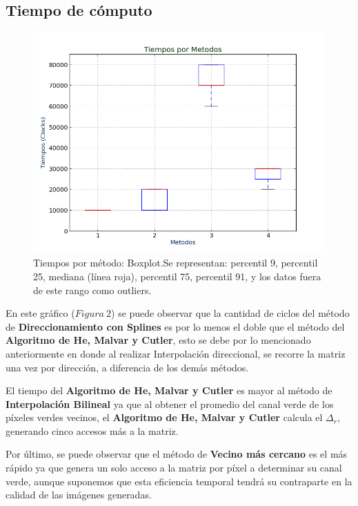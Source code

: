 \documentclass[a4paper]{article}
\begin{document}
\subsection{Tiempo de cómputo}

\begin{figure}[htbp]
\centering
\includegraphics[width=340pt]{img/Tiempos.png}
\caption{Tiempos por método: Boxplot.\newline Se representan: percentil 9, percentil 25, mediana (línea roja), percentil 75, percentil 91, y los datos fuera de este rango como outliers.}
\end{figure}

En este gráfico ($Figura\ 2$) se puede observar que la cantidad de ciclos del método de \textbf{Direccionamiento con Splines} es por lo menos el doble que el método del \textbf{Algoritmo de He, Malvar y Cutler}, esto se debe por lo mencionado anteriormente en donde al realizar Interpolación direccional, se recorre la matriz una vez por dirección, a diferencia de los demás métodos. 

El tiempo del \textbf{Algoritmo de He, Malvar y Cutler} es mayor al método de \textbf{Interpolación Bilineal} ya que al obtener el promedio del canal verde de los píxeles verdes vecinos, el \textbf{Algoritmo de He, Malvar y Cutler} calcula el $\Delta_r$, generando cinco accesos más a la matriz.

Por último, se puede observar que el método de \textbf{Vecino más cercano} es el más rápido ya que genera un solo acceso a la matriz por píxel a determinar su canal verde, aunque suponemos que esta eficiencia temporal tendrá su contraparte en la calidad de las imágenes generadas.\newline
\end{document}
